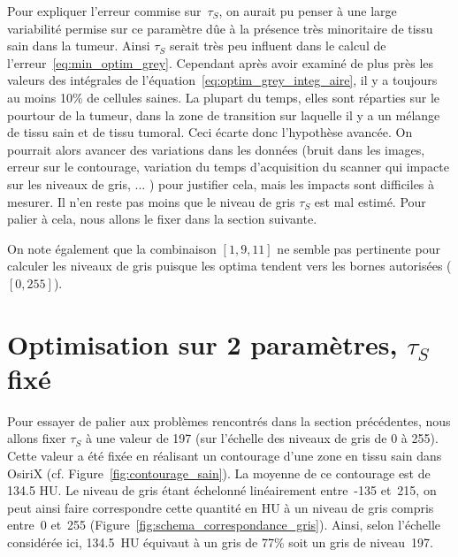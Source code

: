 \documentclass[main.tex]{subfiles}
\begin{document}
Pour expliquer l'erreur commise sur~$\tau_S$, on aurait pu penser à une large variabilité permise sur ce paramètre dûe à la présence très minoritaire de tissu sain dans la tumeur. Ainsi $\tau_S$ serait très peu influent dans le calcul de l'erreur~\eqref{eq:min_optim_grey}. Cependant après avoir examiné de plus près les valeurs des intégrales de l'équation~\eqref{eq:optim_grey_integ_aire}, il y a toujours au moins 10\% de cellules saines. La plupart du temps, elles sont réparties sur le pourtour de la tumeur, dans la zone de transition sur laquelle il y a un mélange de tissu sain et de tissu tumoral. Ceci écarte donc l'hypothèse avancée. On pourrait alors avancer des variations dans les données (bruit dans les images, erreur sur le contourage, variation du temps d'acquisition du scanner qui impacte sur les niveaux de gris, ... ) pour justifier cela, mais les impacts sont difficiles à mesurer. 
Il n'en reste pas moins que le niveau de gris $\tau_S$ est mal estimé. 
Pour palier à cela, nous allons le fixer dans la section suivante.

On note également que la combinaison $[1,9,11]$ ne semble pas pertinente pour calculer les niveaux de gris puisque les optima tendent vers les bornes autorisées ($[0,255]$).

\section{Optimisation sur 2 paramètres, $\tau_S$ fixé}
Pour essayer de palier aux problèmes rencontrés dans la section précédentes, nous allons fixer $\tau_S$ à une valeur de 197 (sur l'échelle des niveaux de gris de 0 à 255). Cette valeur a été fixée en réalisant un contourage d'une zone en tissu sain dans OsiriX (cf. Figure~\ref{fig:contourage_sain}). La moyenne de ce contourage est de 134.5 HU. Le niveau de gris étant échelonné linéairement entre~-135 et~215, on peut ainsi faire correspondre cette quantité en HU à un niveau de gris compris entre~0 et~255 (\cf Figure~\ref{fig:schema_correspondance_gris}). Ainsi, selon l'échelle considérée ici, 134.5~HU équivaut à un gris de 77\% soit un gris de niveau~197.
\end{document}
